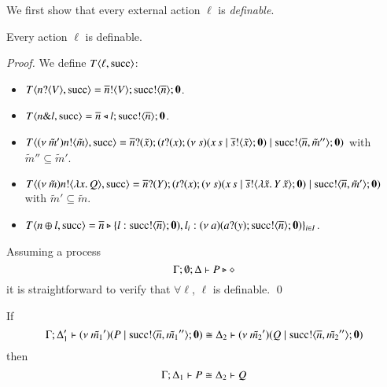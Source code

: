We first show that every external action $\ell$ is {\em definable}.

\begin{lemma}[Definibility]
	\label{lem:definibility}
	Every action $\ell$ is definable.
\end{lemma}

\begin{proof}
	\noi We define $T\langle \ell, \textrm{succ} \rangle$:
%
	\begin{itemize}
		\item	$T\langle n ? \langle V \rangle, \textrm{succ} \rangle = \overline{n} ! \langle V \rangle ; \textrm{succ} ! \langle \overline{n} \rangle ; \mathbf{0}$.

		\item	$T\langle n \& l, \textrm{succ} \rangle = \overline{n} \triangleleft l ; \textrm{succ} ! \langle \overline{n} \rangle ; \mathbf{0}$.


		\item	$T\langle (\nu\ \tilde{m}') n ! \langle \tilde{m} \rangle, \textrm{succ} \rangle = \overline{n} ? (\tilde{x}) ; (t ? (x) ; (\nu\ s)(x\,s \;|\; \overline{s} ! \langle \tilde{x} \rangle ; \mathbf{0}) \;|\; \textrm{succ} ! \langle \overline{n}, \tilde{m}'' \rangle ; \mathbf{0})$
			with $\tilde{m}'' \subseteq \tilde{m}'$.

		\item	$T\langle (\nu\ \tilde{m}) n ! \langle \lambda x.\,Q \rangle, \textrm{succ} \rangle = \overline{n} ? (Y) ; (t ? (x) ; (\nu\ s)(x\,s \;|\; \overline{s} ! \langle \lambda \tilde{x}.\,Y\,\tilde{x} \rangle ; \mathbf{0}) \;|\; \textrm{succ} ! \langle \overline{n}, \tilde{m}' \rangle ; \mathbf{0})$ with $\tilde{m}' \subseteq \tilde{m}$.

		\item	$T\langle n \oplus l, \textrm{succ} \rangle = \overline{n} \triangleright \{l: \textrm{succ} ! \langle \overline{n} \rangle ; \mathbf{0}), l_i: (\nu\ a)(a ? (y) ; \textrm{succ} ! \langle \overline{n} \rangle ; \mathbf{0})\}_{i \in I}$.
	\end{itemize}

	\noi Assuming a process 
	\[
		\Gamma; \emptyset; \Delta \vdash P \triangleright \diamond
	\] 
	\noi it is straightforward to verify that $\forall \ell$, $\ell$ is definable.
	\qed
\end{proof}

\begin{lemma}[Extrusion]\rm
	\label{lem:extrusion}
	If 
	\[
		\Gamma; \Delta_1' \vdash (\nu\ \tilde{m_1}')(P \;|\; \textrm{succ} ! \langle \overline{n}, \tilde{m_1}'' \rangle ; \mathbf{0}) \cong \Delta_2 \vdash (\nu\ \tilde{m_2}')(Q \;|\; \textrm{succ} ! \langle \overline{n}, \tilde{m_2}'' \rangle ; \mathbf{0})
	\]
	then
	\[
		\Gamma; \Delta_1 \vdash P \cong \Delta_2 \vdash Q
	\]
\end{lemma}


